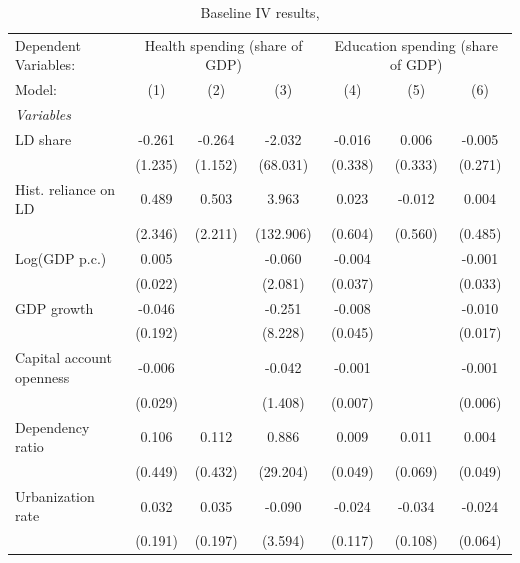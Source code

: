 
\begin{table}[htbp]
   \caption{\label{tab:app_results_baseline_iv_overall_} Baseline IV results, }
   \centering
   \begin{tabular}{lcccccc}
      \tabularnewline \midrule \midrule
      Dependent Variables: & \multicolumn{3}{c}{Health spending (share of GDP)} & \multicolumn{3}{c}{Education spending (share of GDP)}\\
      Model:                     & (1)      & (2)      & (3)       & (4)      & (5)      & (6)\\  
      \midrule
      \emph{Variables}\\
      LD share                   & -0.261   & -0.264   & -2.032    & -0.016   & 0.006    & -0.005\\   
                                 & (1.235)  & (1.152)  & (68.031)  & (0.338)  & (0.333)  & (0.271)\\   
      Hist. reliance on LD       & 0.489    & 0.503    & 3.963     & 0.023    & -0.012   & 0.004\\   
                                 & (2.346)  & (2.211)  & (132.906) & (0.604)  & (0.560)  & (0.485)\\   
      Log(GDP p.c.)              & 0.005    &          & -0.060    & -0.004   &          & -0.001\\   
                                 & (0.022)  &          & (2.081)   & (0.037)  &          & (0.033)\\   
      GDP growth                 & -0.046   &          & -0.251    & -0.008   &          & -0.010\\   
                                 & (0.192)  &          & (8.228)   & (0.045)  &          & (0.017)\\   
      Capital account openness   & -0.006   &          & -0.042    & -0.001   &          & -0.001\\   
                                 & (0.029)  &          & (1.408)   & (0.007)  &          & (0.006)\\   
      Dependency ratio           & 0.106    & 0.112    & 0.886     & 0.009    & 0.011    & 0.004\\   
                                 & (0.449)  & (0.432)  & (29.204)  & (0.049)  & (0.069)  & (0.049)\\   
      Urbanization rate          & 0.032    & 0.035    & -0.090    & -0.024   & -0.034   & -0.024\\   
                                 & (0.191)  & (0.197)  & (3.594)   & (0.117)  & (0.108)  & (0.064)\\   

\end{tabular}
\end{table}
